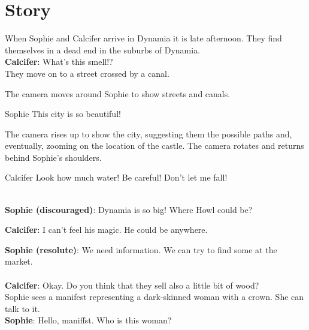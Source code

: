 \section{Story}

When Sophie and Calcifer arrive in Dynamia it is late afternoon. They find themselves in a dead end in the suburbs of Dynamia.\\

\textbf{Calcifer}: What’s this smell!?\\

\noindent They move on to a street crossed by a canal.

\begin{screenplay}

The camera  moves around Sophie to show streets and canals. 

\begin{dialogue}[amazed]{Sophie}
This city is so beautiful!
\end{dialogue}

The camera rises up to show the city, suggesting them the possible paths and, eventually,  zooming on the location of the castle. The camera rotates and returns behind Sophie's shoulders. 

\begin{dialogue}[worried]{Calcifer}
Look how much water! Be careful! Don’t let me fall!
\end{dialogue}
\end{screenplay}

\noindent \\

\textbf{Sophie (discouraged)}: Dynamia is so big! Where Howl could be?

\textbf{Calcifer}: I can’t feel his magic. He could be anywhere.

\textbf{Sophie (resolute)}: We need information. We can try to find some at the market. \\

\\

\textbf{Calcifer}: Okay. Do you think that they sell also a little bit of wood?\\

\noindent Sophie sees a manifest representing a dark-skinned woman with a crown. She can talk to it.\\

\textbf{Sophie}: Hello, maniffst. Who is this woman?

